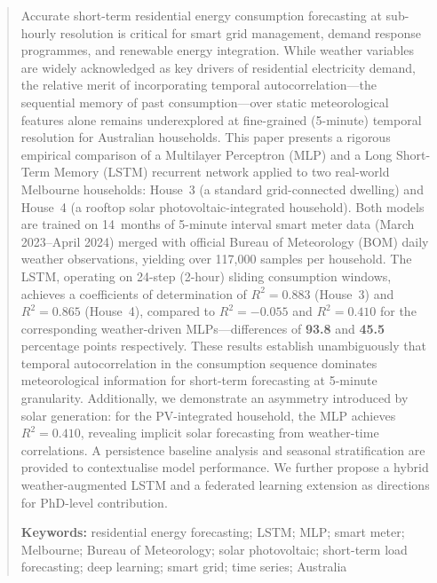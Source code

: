 \documentclass[12pt,a4paper]{article}
\begin{document}
\clearpage
\pagestyle{fancy}

\begin{abstract}
\noindent
Accurate short-term residential energy consumption forecasting at sub-hourly
resolution is critical for smart grid management, demand response programmes,
and renewable energy integration. While weather variables are widely
acknowledged as key drivers of residential electricity demand, the relative
merit of incorporating temporal autocorrelation---the sequential memory of past
consumption---over static meteorological features alone remains underexplored
at fine-grained (5-minute) temporal resolution for Australian households. This
paper presents a rigorous empirical comparison of a Multilayer Perceptron
(MLP) and a Long Short-Term Memory (LSTM) recurrent network applied to two
real-world Melbourne households: House~3 (a standard grid-connected dwelling)
and House~4 (a rooftop solar photovoltaic-integrated household). Both models
are trained on 14~months of 5-minute interval smart meter data (March
2023--April 2024) merged with official Bureau of Meteorology (BOM) daily
weather observations, yielding over 117,000 samples per household. The LSTM,
operating on 24-step (2-hour) sliding consumption windows, achieves a
coefficients of determination of $R^2 = 0.883$ (House~3) and $R^2 = 0.865$
(House~4), compared to $R^2 = -0.055$ and $R^2 = 0.410$ for the corresponding
weather-driven MLPs---differences of \textbf{93.8} and \textbf{45.5} percentage
points respectively. These
results establish unambiguously that temporal autocorrelation in the
consumption sequence dominates meteorological information for short-term
forecasting at 5-minute granularity. Additionally, we demonstrate an
asymmetry introduced by solar generation: for the PV-integrated household,
the MLP achieves $R^2 = 0.410$, revealing implicit solar forecasting from
weather-time correlations. A persistence baseline analysis and seasonal
stratification are provided to contextualise model performance. We further
propose a hybrid weather-augmented LSTM and a federated learning extension
as directions for PhD-level contribution.

\vspace{6pt}
\noindent\textbf{Keywords:} residential energy forecasting; LSTM; MLP; smart
meter; Melbourne; Bureau of Meteorology; solar photovoltaic; short-term load
forecasting; deep learning; smart grid; time series; Australia
\end{abstract}
\end{document}
